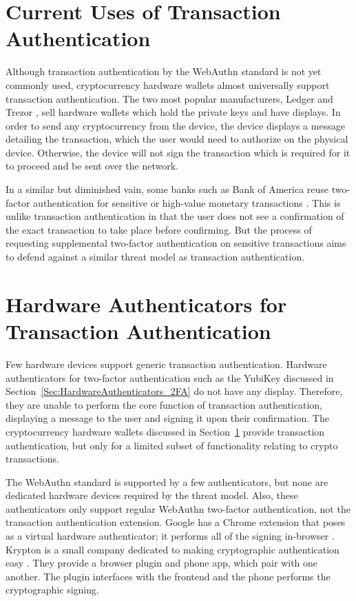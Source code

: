 \section{Current Uses of Transaction Authentication}\label{Sec:CurrentUses_txAuthn}

Although transaction authentication by the WebAuthn standard is not yet commonly used, cryptocurrency hardware wallets almost universally support transaction authentication. The two most popular manufacturers, Ledger \cite{ledger} and Trezor \cite{trezor}, sell hardware wallets which hold the private keys and have displays. In order to send any cryptocurrency from the device, the device displays a message detailing the transaction, which the user would need to authorize on the physical device. Otherwise, the device will not sign the transaction which is required for it to proceed and be sent over the network.

In a similar but diminished vain, some banks such as Bank of America reuse two-factor authentication for sensitive or high-value monetary transactions \cite{BoA-2FA}. This is unlike transaction authentication in that the user does not see a confirmation of the exact transaction to take place before confirming. But the process of requesting supplemental two-factor authentication on sensitive transactions aims to defend against a similar threat model as transaction authentication.

\section{Hardware Authenticators for \newline Transaction Authentication}

Few hardware devices support generic transaction authentication. Hardware authenticators for two-factor authentication such as the YubiKey discussed in Section~\ref{Sec:HardwareAuthenticators_2FA} do not have any display. Therefore, they are unable to perform the core function of transaction authentication, displaying a message to the user and signing it upon their confirmation. The cryptocurrency hardware wallets discussed in Section~\ref{Sec:CurrentUses_txAuthn} provide transaction authentication, but only for a limited subset of functionality relating to crypto transactions.  

The WebAuthn standard is supported by a few authenticators, but none are dedicated hardware devices required by the threat model. Also, these authenticators only support regular WebAuthn two-factor authentication, not the transaction authentication extension. Google has a Chrome extension that poses as a virtual hardware authenticator; it performs all of the signing in-browser \cite{virtual-authenticators-tab}. Krypton is a small company dedicated to making cryptographic authentication easy \cite{krypton}. They provide a browser plugin and phone app, which pair with one another. The plugin interfaces with the frontend and the phone performs the cryptographic signing. 

